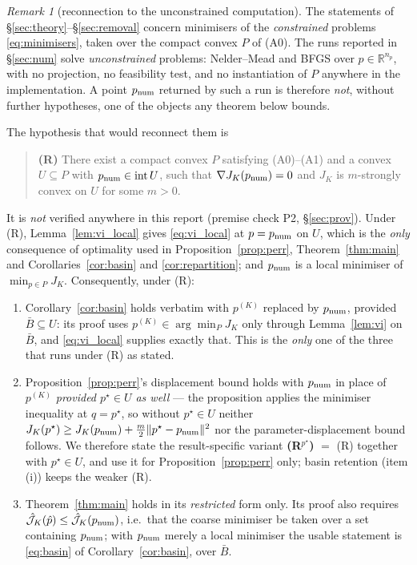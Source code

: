 \documentclass[11pt]{article}
\theoremstyle{remark}\newtheorem{remark}{Remark}
\newcommand{\pstar}{p^\star}
\newcommand{\norm}[1]{\lVert #1\rVert}
\newcommand{\hatJ}{\hat{\mathcal J}}
\begin{document}
\begin{remark}[reconnection to the unconstrained computation]\label{rem:reconnect}
The statements of \S\ref{sec:theory}--\S\ref{sec:removal} concern minimisers of the \emph{constrained} problems \eqref{eq:minimisers}, taken over the compact convex $P$ of (A0). The runs reported in \S\ref{sec:num} solve \emph{unconstrained} problems: Nelder--Mead and BFGS over $p\in\mathbb R^{n_p}$, with no projection, no feasibility test, and no instantiation of $P$ anywhere in the implementation. A point $p_{\rm num}$ returned by such a run is therefore \emph{not}, without further hypotheses, one of the objects any theorem below bounds.

The hypothesis that would reconnect them is
\begin{quote}
\textbf{(R)} There exist a compact convex $P$ satisfying (A0)--(A1) and a convex $U\subseteq P$ with $p_{\rm num}\in\operatorname{int}U$, such that $\nabla J_K(p_{\rm num})=0$ and $J_K$ is $m$-strongly convex on $U$ for some $m>0$.
\end{quote}
It is \emph{not} verified anywhere in this report (premise check P2, \S\ref{sec:prov}). Under (R), Lemma~\ref{lem:vi_local} gives \eqref{eq:vi_local} at $p=p_{\rm num}$ on $U$, which is the \emph{only} consequence of optimality used in Proposition~\ref{prop:perr}, Theorem~\ref{thm:main} and Corollaries~\ref{cor:basin} and \ref{cor:repartition}; and $p_{\rm num}$ is a local minimiser of $\min_{p\in P}J_K$. Consequently, under (R):
\begin{enumerate}[nosep,label=(\roman*)]
\item Corollary~\ref{cor:basin} holds verbatim with $p^{(K)}$ replaced by $p_{\rm num}$, provided $\bar B\subseteq U$: its proof uses $p^{(K)}\in\arg\min_P J_K$ only through Lemma~\ref{lem:vi} on $\bar B$, and \eqref{eq:vi_local} supplies exactly that. This is the \emph{only} one of the three that runs under (R) as stated.
\item Proposition~\ref{prop:perr}'s displacement bound holds with $p_{\rm num}$ in place of $p^{(K)}$ \emph{provided $\pstar\in U$ as well} --- the proposition applies the minimiser inequality at $q=\pstar$, so without $\pstar\in U$ neither $J_K(\pstar)\ge J_K(p_{\rm num})+\tfrac m2\norm{\pstar-p_{\rm num}}^2$ nor the parameter-displacement bound follows. We therefore state the result-specific variant \textbf{(R$^{\pstar}$)} $=$ (R) together with $\pstar\in U$, and use it for Proposition~\ref{prop:perr} only; basin retention (item (i)) keeps the weaker (R).
\item Theorem~\ref{thm:main} holds in its \emph{restricted} form only. Its proof also requires $\hatJ_K(\hat p)\le\hatJ_K(p_{\rm num})$, i.e.\ that the coarse minimiser be taken over a set containing $p_{\rm num}$; with $p_{\rm num}$ merely a local minimiser the usable statement is \eqref{eq:basin} of Corollary~\ref{cor:basin}, over $\bar B$.

\end{enumerate}
\end{remark}
\end{document}
